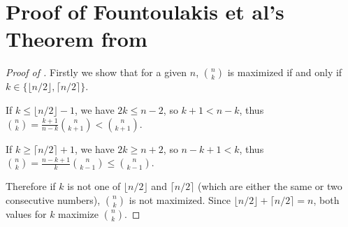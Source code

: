 \documentclass{toc}
\begin{document}
			
			
			\appendix
			
			
			\section{Proof of Fountoulakis et al's Theorem from } 
			\label{appx:FKM-proof}
			
			\iffalse %
			\begin{proof}[Proof of ]
				Firstly we show that for a given $n$, $\binom{n}{k}$ is maximized if and only if $k \in \{\lfloor n/2 \rfloor, \lceil n/2 \rceil\}$.
				
				\medskip
				
				\noindent If $k \le \lfloor n/2 \rfloor - 1$, we have $2k \le n - 2$, so $k + 1 < n - k$, thus
				$\displaystyle \binom{n}{k} = \frac{k + 1}{n - k} \binom{n}{k + 1} < \binom{n}{k + 1}$.
				
				\medskip
				
				\noindent If $k \ge \lceil n/2 \rceil + 1$, we have $2k \ge n + 2$, so $n - k + 1 < k$, thus
				$\displaystyle \binom{n}{k} = \frac{n - k + 1}{k} \binom{n}{k - 1} \le \binom{n}{k - 1}$.
				
				\medskip
				
				Therefore if $k$ is not one of $\lfloor n/2 \rfloor$ and $\lceil n/2 \rceil$ (which are either the same or two consecutive numbers), $\binom{n}{k}$ is not maximized.
				Since $\lfloor n/2 \rfloor + \lceil n/2 \rceil = n$, both values for $k$
				maximize $\binom{n}{k}$.  %
				

\end{proof}
\end{document}
